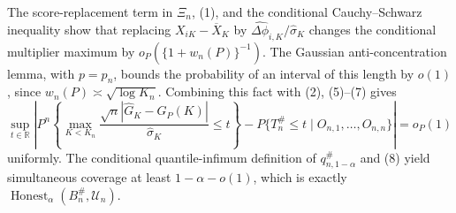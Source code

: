 The score-replacement term in \(\Xi_n\), (1), and the conditional Cauchy--Schwarz inequality show that replacing \(X_{iK}-\overline X_K\) by \(\widehat{\Delta\phi}_{i,K}/\widehat\sigma_K\) changes the conditional multiplier maximum by \(o_P(\{1+w_n(P)\}^{-1})\).  The Gaussian anti-concentration lemma, with \(p=p_n\), bounds the probability of an interval of this length by \(o(1)\), since \(w_n(P)\asymp\sqrt{\log K_n}\).  Combining this fact with (2), (5)--(7) gives
\[
 \sup_{t\in\mathbb R}\left|
 P^n\!\left\{\max_{K<K_n}\frac{\sqrt n|\widehat G_K-G_P(K)|}{\widehat\sigma_K}\leq t\right\}
 -P\{T_n^{\#}\leq t\mid O_{n,1},\ldots,O_{n,n}\}
 \right|=o_P(1)                                                                  \tag{8}
\]
uniformly.  The conditional quantile-infimum definition of \(q_{n,1-\alpha}^{\#}\) and (8) yield simultaneous coverage at least \(1-\alpha-o(1)\), which is exactly \(\operatorname{Honest}_{\alpha}(B_n^{\#},\mathcal U_n)\).

